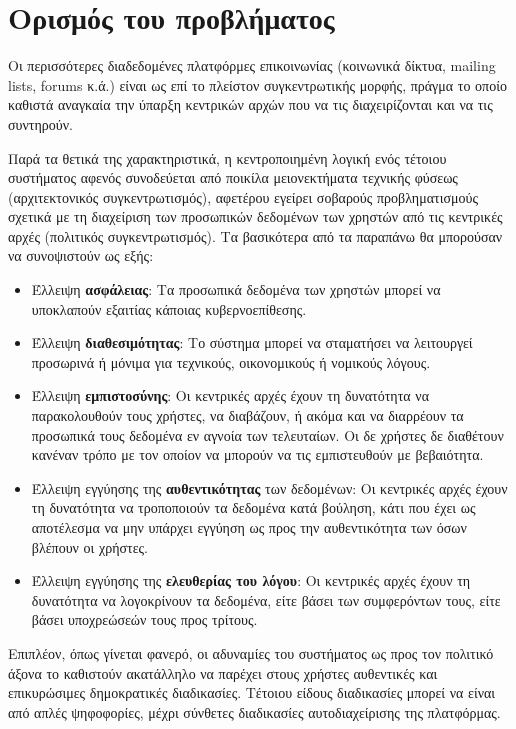 \section{Ορισμός του προβλήματος}\label{section:1-3-problem-definition}

Οι περισσότερες διαδεδομένες πλατφόρμες επικοινωνίας (κοινωνικά δίκτυα, mailing lists, forums κ.ά.) είναι ως επί το πλείστον συγκεντρωτικής μορφής, πράγμα το οποίο καθιστά αναγκαία την ύπαρξη κεντρικών αρχών που να τις διαχειρίζονται και να τις συντηρούν. 

Παρά τα θετικά της χαρακτηριστικά, η κεντροποιημένη λογική ενός τέτοιου συστήματος αφενός συνοδεύεται από ποικίλα μειονεκτήματα τεχνικής φύσεως (αρχιτεκτονικός συγκεντρωτισμός), αφετέρου εγείρει σοβαρούς προβληματισμούς σχετικά με τη διαχείριση των προσωπικών δεδομένων των χρηστών από τις κεντρικές αρχές (πολιτικός συγκεντρωτισμός). Τα βασικότερα από τα παραπάνω θα μπορούσαν να συνοψιστούν ως εξής: 

\begin{itemize}
	\item Έλλειψη \textbf{ασφάλειας}: Τα προσωπικά δεδομένα των χρηστών μπορεί να υποκλαπούν εξαιτίας κάποιας κυβερνοεπίθεσης.
	\item Έλλειψη \textbf{διαθεσιμότητας}: Το σύστημα μπορεί να σταματήσει να λειτουργεί προσωρινά ή μόνιμα για τεχνικούς, οικονομικούς ή νομικούς λόγους.
	\item Έλλειψη \textbf{εμπιστοσύνης}: Οι κεντρικές αρχές έχουν τη δυνατότητα να παρακολουθούν τους χρήστες, να διαβάζουν, ή ακόμα και να διαρρέουν τα προσωπικά τους δεδομένα εν αγνοία των τελευταίων. Οι δε χρήστες δε διαθέτουν κανέναν τρόπο με τον οποίον να μπορούν να τις εμπιστευθούν με βεβαιότητα.
	\item Έλλειψη εγγύησης της \textbf{αυθεντικότητας} των δεδομένων: Οι κεντρικές αρχές έχουν τη δυνατότητα να τροποποιούν τα δεδομένα κατά βούληση, κάτι που έχει ως αποτέλεσμα να μην υπάρχει εγγύηση ως προς την αυθεντικότητα των όσων βλέπουν οι χρήστες.
	\item Έλλειψη εγγύησης της \textbf{ελευθερίας του λόγου}: Οι κεντρικές αρχές έχουν τη δυνατότητα να λογοκρίνουν τα δεδομένα, είτε βάσει των συμφερόντων τους, είτε βάσει υποχρεώσεών τους προς τρίτους.
\end{itemize}

Επιπλέον, όπως γίνεται φανερό, οι αδυναμίες του συστήματος ως προς τον πολιτικό άξονα το καθιστούν ακατάλληλο να παρέχει στους χρήστες αυθεντικές και επικυρώσιμες δημοκρατικές διαδικασίες. Τέτοιου είδους διαδικασίες μπορεί να είναι από απλές ψηφοφορίες, μέχρι σύνθετες διαδικασίες αυτοδιαχείρισης της πλατφόρμας.